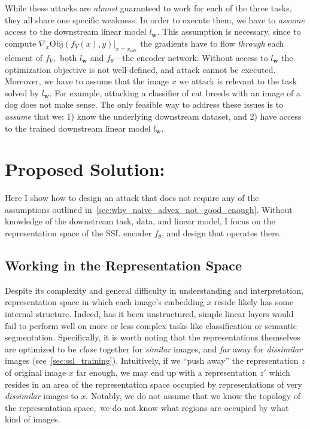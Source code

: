 While these attacks are \textit{almost} guaranteed to work for each of the three tasks, they all share one specific weakness. In order to execute them, we have to \textit{assume} access to the downstream linear model $l_\mathbf{w}$. This assumption is necessary, since to compute $\nabla_x\text{Obj}(f_V(x),y)|_{x=x_{adv}}$ the gradients have to flow \textit{through} each element of $f_V$,~\ie both $l_\mathbf{w}$ and $f_\theta$---the encoder network. Without access to $l_\mathbf{w}$ the optimization objective is not well-defined, and attack cannot be executed. Moreover, we have to assume that the image $x$ we attack is relevant to the task solved by $l_\mathbf{w}$. For example, attacking a classifier of cat breeds with an image of a dog does not make sense. The only feasible way to address these issues is to \textit{assume} that we: 1) know the underlying downstream dataset, and 2) have access to the trained downstream linear model $l_\mathbf{w}$. 

\section{Proposed Solution: \EmbedAttack}

Here I show how to design an attack that does not require any of the assumptions outlined in~\cref{sec:why_naive_advex_not_good_enough}. Without knowledge of the downstream task, data, and linear model, I focus on the representation space of the SSL encoder $f_\theta$, and design \EmbedAttack that operates there. 

\subsection{Working in the Representation Space}\label{sec:embatk_intuition}

Despite its complexity and general difficulty in understanding and interpretation, representation space in which each image's embedding $x$ reside likely has some internal structure. Indeed, has it been unstructured, simple linear layers would fail to perform well on more or less complex tasks like classification or semantic segmentation. Specifically, it is worth noting that the representations themselves are optimized to be \textit{close} together for \textit{similar} images, and \textit{far} away for \textit{dissimilar} images (see~\cref{sec:ssl_training}). Intuitively, if we ``push away'' the representation $z$ of original image $x$ far enough, we may end up with a representation $z'$ which resides in an area of the representation space occupied by representations of very \textit{dissimilar} images to $x$. Notably, we do not assume that we know the topology of the representation space,~\ie we do not know what regions are occupied by what kind of images. 


